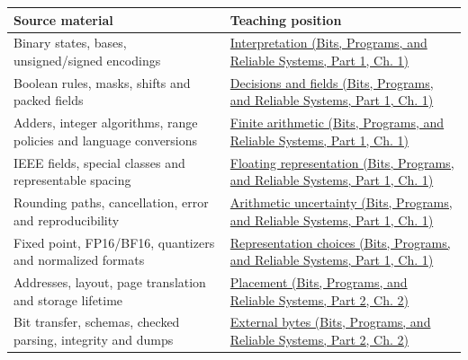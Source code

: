 {\def\LTcaptype{none} %
\begin{longtable}[]{@{}
  >{\raggedright\arraybackslash}p{}
  >{\raggedright\arraybackslash}p{}@{}}
\toprule\noalign{}
\begin{minipage}[b]{\linewidth}\raggedright
Source material
\end{minipage} & \begin{minipage}[b]{\linewidth}\raggedright
Teaching position
\end{minipage} \\
\midrule\noalign{}
\endhead
\bottomrule\noalign{}
\endlastfoot
Binary states, bases, unsigned/signed encodings & \href{../01-Bits-Programs-and-Reliable-Systems-P01/main.pdf\#nameddest=01-foundations-i-ch001-from-a-signal-to-an-interpretation}{Interpretation (Bits, Programs, and Reliable Systems, Part 1, Ch. 1)} \\
Boolean rules, masks, shifts and packed fields & \href{../01-Bits-Programs-and-Reliable-Systems-P01/main.pdf\#nameddest=01-foundations-i-ch001-bits-become-decisions-and-compact-fields}{Decisions and fields (Bits, Programs, and Reliable Systems, Part 1, Ch. 1)} \\
Adders, integer algorithms, range policies and language conversions & \href{../01-Bits-Programs-and-Reliable-Systems-P01/main.pdf\#nameddest=01-foundations-i-ch001-arithmetic-becomes-a-policy}{Finite arithmetic (Bits, Programs, and Reliable Systems, Part 1, Ch. 1)} \\
IEEE fields, special classes and representable spacing & \href{../01-Bits-Programs-and-Reliable-Systems-P01/main.pdf\#nameddest=01-foundations-i-ch001-a-stretching-ruler-for-real-valued-quantities}{Floating representation (Bits, Programs, and Reliable Systems, Part 1, Ch. 1)} \\
Rounding paths, cancellation, error and reproducibility & \href{../01-Bits-Programs-and-Reliable-Systems-P01/main.pdf\#nameddest=01-foundations-i-ch001-when-arithmetic-meets-uncertainty}{Arithmetic uncertainty (Bits, Programs, and Reliable Systems, Part 1, Ch. 1)} \\
Fixed point, FP16/BF16, quantizers and normalized formats & \href{../01-Bits-Programs-and-Reliable-Systems-P01/main.pdf\#nameddest=01-foundations-i-ch001-choosing-what-information-to-keep}{Representation choices (Bits, Programs, and Reliable Systems, Part 1, Ch. 1)} \\
Addresses, layout, page translation and storage lifetime & \href{../01-Bits-Programs-and-Reliable-Systems-P02/main.pdf\#nameddest=01-foundations-i-ch002-where-the-bytes-live}{Placement (Bits, Programs, and Reliable Systems, Part 2, Ch. 2)} \\
Bit transfer, schemas, checked parsing, integrity and dumps & \href{../01-Bits-Programs-and-Reliable-Systems-P02/main.pdf\#nameddest=01-foundations-i-ch002-bytes-become-a-durable-agreement}{External bytes (Bits, Programs, and Reliable Systems, Part 2, Ch. 2)} \\
\end{longtable}
}

